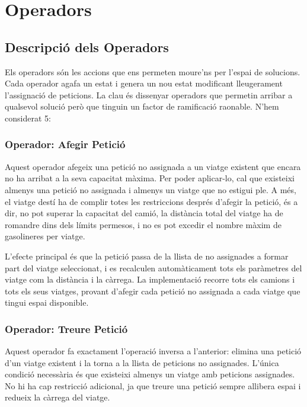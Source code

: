 \section{Operadors}
\label{sec:operadors}

\vspace{0.5cm}

\subsection{Descripció dels Operadors}

Els operadors són les accions que ens permeten moure'ns per l'espai de solucions. Cada operador agafa un estat i genera un nou estat modificant lleugerament l'assignació de peticions. La clau és dissenyar operadors que permetin arribar a qualsevol solució però que tinguin un factor de ramificació raonable. N'hem considerat 5:

\vspace{0.5cm}

\subsubsection{Operador: Afegir Petició}

Aquest operador afegeix una petició no assignada a un viatge existent que encara no ha arribat a la seva capacitat màxima. Per poder aplicar-lo, cal que existeixi almenys una petició no assignada i almenys un viatge que no estigui ple. A més, el viatge destí ha de complir totes les restriccions després d'afegir la petició, és a dir, no pot superar la capacitat del camió, la distància total del viatge ha de romandre dins dels límits permesos, i no es pot excedir el nombre màxim de gasolineres per viatge.

L'efecte principal és que la petició passa de la llista de no assignades a formar part del viatge seleccionat, i es recalculen automàticament tots els paràmetres del viatge com la distància i la càrrega. La implementació recorre tots els camions i tots els seus viatges, provant d'afegir cada petició no assignada a cada viatge que tingui espai disponible.

\vspace{0.5cm}

\subsubsection{Operador: Treure Petició}

Aquest operador fa exactament l'operació inversa a l'anterior: elimina una petició d'un viatge existent i la torna a la llista de peticions no assignades. L'única condició necessària és que existeixi almenys un viatge amb peticions assignades. No hi ha cap restricció adicional, ja que treure una petició sempre allibera espai i redueix la càrrega del viatge.


